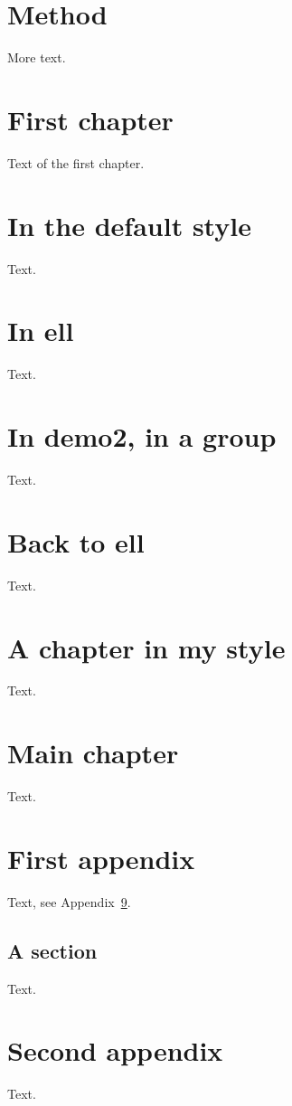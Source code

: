 \documentclass[11pt,oneside]{memoir}
\begin{document}
\chapter{Method}
More text.
\chapter{First chapter}
Text of the first chapter.
\chapter{In the default style}
Text.
\chapter{In ell}
Text.
\begingroup
{}
\chapter{In demo2, in a group}
Text.
\endgroup
\chapter{Back to ell}
Text.
\chapter{A chapter in my style}
Text.
\chapter{Main chapter}
Text.
\appendix
\chapter{First appendix}\label{app:one}
Text, see Appendix~\ref{app:one}.
\section{A section}
Text.
\chapter{Second appendix}
Text.
\end{document}
